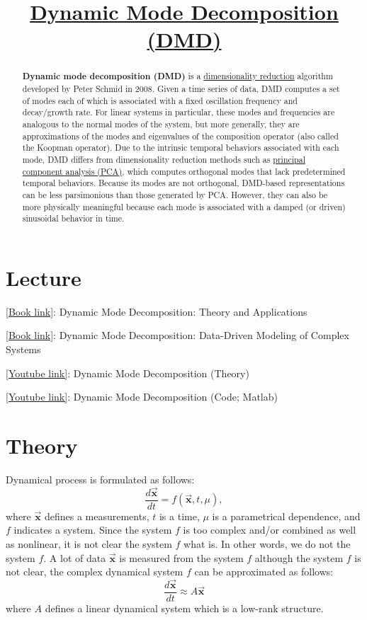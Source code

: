 \documentclass[onecolumn]{IEEEtran}
\title{ \href{https://en.wikipedia.org/wiki/Dynamic_mode_decomposition}{Dynamic Mode Decomposition (DMD)}}
\begin{document}
\maketitle

\begin{abstract}
\textbf{Dynamic mode decomposition (DMD)} is a \href{https://en.wikipedia.org/wiki/Dimensionality_reduction}{dimensionality reduction} algorithm developed by Peter Schmid in 2008. Given a time series of data, DMD computes a set of modes each of which is associated with a fixed oscillation frequency and decay/growth rate. For linear systems in particular, these modes and frequencies are analogous to the normal modes of the system, but more generally, they are approximations of the modes and eigenvalues of the composition operator (also called the Koopman operator). Due to the intrinsic temporal behaviors associated with each mode, DMD differs from dimensionality reduction methods such as \href{https://en.wikipedia.org/wiki/Principal_component_analysis}{principal component analysis (PCA)}, which computes orthogonal modes that lack predetermined temporal behaviors. Because its modes are not orthogonal, DMD-based representations can be less parsimonious than those generated by PCA. However, they can also be more physically meaningful because each mode is associated with a damped (or driven) sinusoidal behavior in time.
\end{abstract}


\section{Lecture}
\label{lecture}
\href{http://cwrowley.princeton.edu/theses/tu.pdf}{[Book link]}:
Dynamic Mode Decomposition: Theory and Applications

\href{http://www.dmdbook.com}{[Book link]}:
Dynamic Mode Decomposition:
Data-Driven Modeling of Complex Systems

\href{https://www.youtube.com/watch?v=bYfGVQ1Sg98}{[Youtube link]}: Dynamic Mode Decomposition (Theory)

\href{https://www.youtube.com/watch?v=KAau5TBU0Sc}{[Youtube link]}: Dynamic Mode Decomposition (Code; Matlab)


\section{Theory}
\label{theory}
Dynamical process is formulated as follows:
$$\frac{d\vec{\mathbf{x}}}{dt} = f(\vec{\mathbf{x}}, t, \mu),$$
where $\vec{\mathbf{x}}$ defines a measurements, $t$ is a time, $\mu$ is a parametrical dependence, and $f$ indicates a system. Since the system $f$ is too complex and/or combined as well as nonlinear, it is not clear the system $f$ what is. In other words, we do not the system $f$. A lot of data $\vec{\mathbf{x}}$ is measured from the system $f$ although the system $f$ is not clear, the complex dynamical system $f$ can be approximated as follows:
$$ \frac{d\vec{\mathbf{x}}}{dt} \approx A\vec{\mathbf{x}}$$ 
where $A$ defines a linear dynamical system which is a low-rank structure.\\
\end{document}
